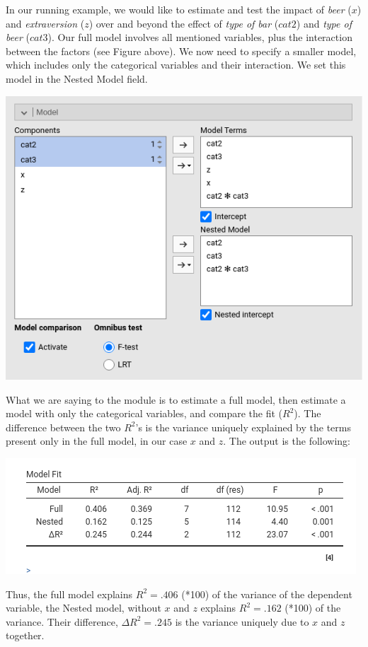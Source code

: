 \documentclass[
]{book}
\begin{document}
In our running example, we would like to estimate and test the impact of \emph{beer} (\(x\)) and \emph{extraversion} (\(z\)) over and beyond the effect of \emph{type of bar} (\(cat2\)) and \emph{type of beer} (\(cat3\)). Our full model involves all mentioned variables, plus the interaction between the factors (see Figure above). We now need to specify a smaller model, which includes only the categorical variables and their interaction. We set this model in the {Nested Model} field.

\includegraphics{bookletpics/2_modelcomparison_input2.png}

What we are saying to the module is to estimate a full model, then estimate a model with only the categorical variables, and compare the fit (\(R^2\)). The difference between the two \(R^2\)'s is the variance uniquely explained by the terms present only in the full model, in our case \(x\) and \(z\). The output is the following:

\includegraphics{bookletpics/2_modelcomparison_output2.png}

Thus, the full model explains \(R^2=.406\) (*100) of the variance of the dependent variable, the Nested model, without \(x\) and \(z\) explains \(R^2=.162\) (*100) of the variance. Their difference, \(\Delta R^2=.245\) is the variance uniquely due to \(x\) and \(z\) together.
\end{document}
